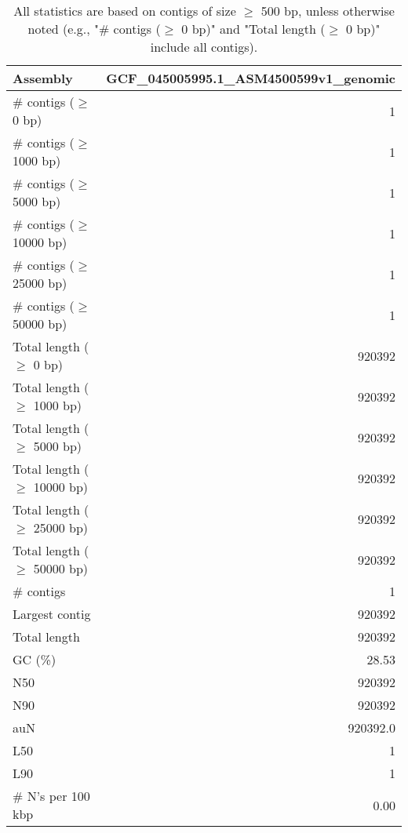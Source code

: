 \documentclass[12pt,a4paper]{article}
\begin{document}
\begin{table}[ht]
\begin{center}
\caption{All statistics are based on contigs of size $\geq$ 500 bp, unless otherwise noted (e.g., "\# contigs ($\geq$ 0 bp)" and "Total length ($\geq$ 0 bp)" include all contigs).}
\begin{tabular}{|l*{1}{|r}|}
\hline
Assembly & GCF\_045005995.1\_ASM4500599v1\_genomic \\ \hline
\# contigs ($\geq$ 0 bp) & 1 \\ \hline
\# contigs ($\geq$ 1000 bp) & 1 \\ \hline
\# contigs ($\geq$ 5000 bp) & 1 \\ \hline
\# contigs ($\geq$ 10000 bp) & 1 \\ \hline
\# contigs ($\geq$ 25000 bp) & 1 \\ \hline
\# contigs ($\geq$ 50000 bp) & 1 \\ \hline
Total length ($\geq$ 0 bp) & 920392 \\ \hline
Total length ($\geq$ 1000 bp) & 920392 \\ \hline
Total length ($\geq$ 5000 bp) & 920392 \\ \hline
Total length ($\geq$ 10000 bp) & 920392 \\ \hline
Total length ($\geq$ 25000 bp) & 920392 \\ \hline
Total length ($\geq$ 50000 bp) & 920392 \\ \hline
\# contigs & 1 \\ \hline
Largest contig & 920392 \\ \hline
Total length & 920392 \\ \hline
GC (\%) & 28.53 \\ \hline
N50 & 920392 \\ \hline
N90 & 920392 \\ \hline
auN & 920392.0 \\ \hline
L50 & 1 \\ \hline
L90 & 1 \\ \hline
\# N's per 100 kbp & 0.00 \\ \hline
\end{tabular}
\end{center}
\end{table}
\end{document}
